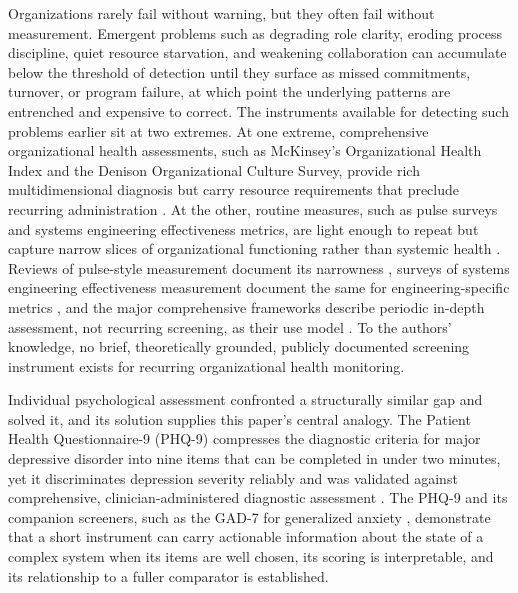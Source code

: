 \documentclass[12pt, letterpaper]{article}
\begin{document}
Organizations rarely fail without warning, but they often fail without measurement. Emergent problems such as degrading role clarity, eroding process discipline, quiet resource starvation, and weakening collaboration can accumulate below the threshold of detection until they surface as missed commitments, turnover, or program failure, at which point the underlying patterns are entrenched and expensive to correct. The instruments available for detecting such problems earlier sit at two extremes. At one extreme, comprehensive organizational health assessments, such as McKinsey's Organizational Health Index and the Denison Organizational Culture Survey, provide rich multidimensional diagnosis but carry resource requirements that preclude recurring administration \parencite{camp2024,denison1995,keller2011}. At the other, routine measures, such as pulse surveys and systems engineering effectiveness metrics, are light enough to repeat but capture narrow slices of organizational functioning rather than systemic health \parencite{brown2022,elm2012}. Reviews of pulse-style measurement document its narrowness \parencite{brown2022}, surveys of systems engineering effectiveness measurement document the same for engineering-specific metrics \parencite{elm2012}, and the major comprehensive frameworks describe periodic in-depth assessment, not recurring screening, as their use model \parencite{camp2024,denison1990}. To the authors' knowledge, no brief, theoretically grounded, publicly documented screening instrument exists for recurring organizational health monitoring.

Individual psychological assessment confronted a structurally similar gap and solved it, and its solution supplies this paper's central analogy. The Patient Health Questionnaire-9 (PHQ-9) compresses the diagnostic criteria for major depressive disorder into nine items that can be completed in under two minutes, yet it discriminates depression severity reliably and was validated against comprehensive, clinician-administered diagnostic assessment \parencite{kroenke2001,negeri2021}. The PHQ-9 and its companion screeners, such as the GAD-7 for generalized anxiety \parencite{spitzer2006}, demonstrate that a short instrument can carry actionable information about the state of a complex system when its items are well chosen, its scoring is interpretable, and its relationship to a fuller comparator is established.
\end{document}
